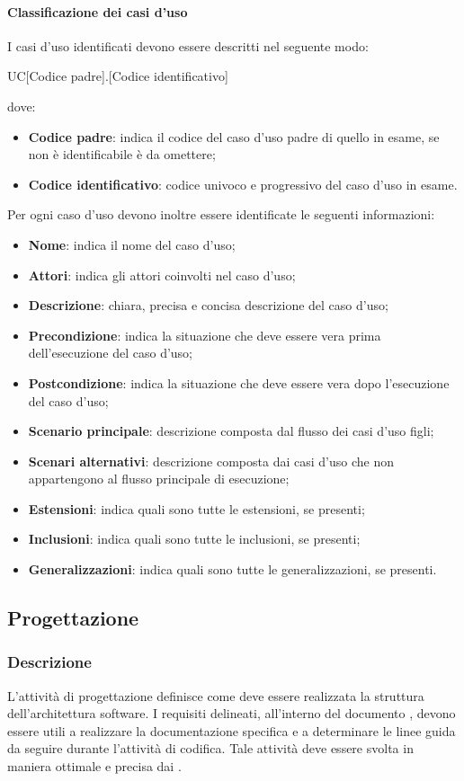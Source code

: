 \paragraph{Classificazione dei casi d'uso}
I casi d'uso identificati devono essere descritti nel seguente modo:
\begin{center}
  UC[Codice padre].[Codice identificativo]
\end{center}
dove:
\begin{itemize}
  \item\textbf{Codice padre}: indica il codice del caso d'uso padre di quello in 
  esame, se non è identificabile è da omettere;
  \item\textbf{Codice identificativo}: codice univoco e progressivo del caso d'uso in esame. 
\end{itemize}
Per ogni caso d'uso devono inoltre essere identificate le seguenti informazioni:
\begin{itemize}
  \item\textbf{Nome}: indica il nome del caso d'uso;
  \item\textbf{Attori}: indica gli attori coinvolti nel caso d'uso;
  \item\textbf{Descrizione}: chiara, precisa e concisa descrizione del caso 
  d'uso;
  \item\textbf{Precondizione}: indica la situazione che deve essere vera prima 
  dell'esecuzione del caso d'uso;
  \item\textbf{Postcondizione}: indica la situazione che deve essere vera dopo 
  l'esecuzione del caso d'uso;
  \item\textbf{Scenario principale}: descrizione composta dal flusso dei casi d'uso 
  figli;
  \item\textbf{Scenari alternativi}: descrizione composta dai casi d'uso che non 
  appartengono al flusso principale di esecuzione;
  \item\textbf{Estensioni}: indica quali sono tutte le estensioni, se presenti;
  \item\textbf{Inclusioni}: indica quali sono tutte le inclusioni, se presenti;
  \item\textbf{Generalizzazioni}: indica quali sono tutte le generalizzazioni, 
  se presenti.
\end{itemize}
\subsection{Progettazione}

\subsubsection{Descrizione}
L'attività di progettazione definisce come deve essere realizzata la struttura dell'architettura software. I requisiti delineati, all'interno del documento \textit{\AdR}, devono essere utili a realizzare la documentazione specifica e a determinare le linee guida da seguire durante l'attività di codifica. 
Tale attività deve essere svolta in maniera ottimale e precisa dai \textit{\Progs}.  
  
